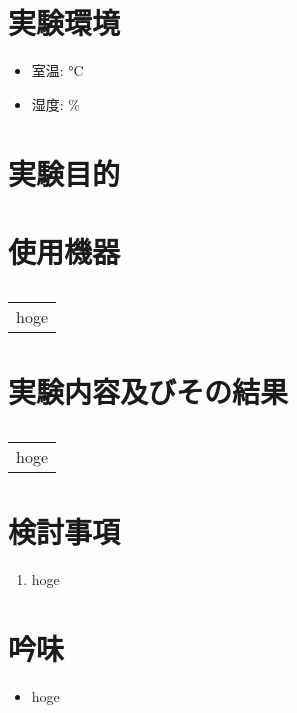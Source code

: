 \documentclass[uplatex, dvipdfmx, a4paper]{ujarticle}
\begin{document}
\section{実験環境}
\begin{itemize}
  \item 室温: $\si{\degreeCelsius}$
  \item 湿度: $\%$
\end{itemize}

\section{実験目的}

\section{使用機器}
\begin{table}[H]
  \centering
  \caption{}
  \label{tab:machinary}
  \begin{tabular}{|c|} \hline
    hoge \\
  \end{tabular}
\end{table}

\section{実験内容及びその結果}

\begin{table}[H]
  \centering
  \caption{}
  \label{tab:}
  \begin{tabular}{|c|} \hline
    hoge \\
  \end{tabular}
\end{table}

\begin{figure}[H]
  \centering
  \caption{}
  \label{fig:}
\end{figure}

\section{検討事項}
\begin{enumerate}
  \item{hoge}
\end{enumerate}

\section{吟味}
\begin{itemize}
  \item{hoge}
\end{itemize}



\end{document}
